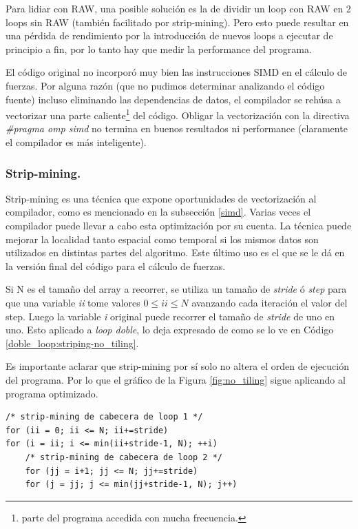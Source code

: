 \documentclass{article}
\begin{document}
Para lidiar con RAW, una posible solución es la de dividir un loop con RAW en 2 loops sin RAW (también
facilitado por strip-mining). Pero esto puede resultar en una pérdida de rendimiento por la introducción
de nuevos loops a ejecutar de principio a fin, por lo tanto hay que medir la performance del programa.


El código original no incorporó muy bien las instrucciones SIMD en el cálculo de fuerzas.
Por alguna razón (que no pudimos determinar analizando el código fuente)
incluso eliminando las dependencias de datos, el compilador se rehúsa a vectorizar
una parte caliente\footnote{parte del programa accedida con mucha frecuencia.} del código. Obligar la vectorización
con la directiva \textit{\#pragma omp simd} no termina en buenos resultados ni performance (claramente el compilador
es más inteligente).

\subsubsection{Strip-mining.\label{strip-mining}}
Strip-mining es una técnica que expone oportunidades de vectorización al compilador, como es mencionado
en la subsección \ref{simd}. Varias veces el compilador puede llevar a cabo esta optimización por su cuenta. La técnica
puede mejorar la localidad tanto espacial como temporal si los mismos datos son utilizados en distintas partes
del algoritmo. Este último uso es el que se le dá en la versión final del código para el cálculo de fuerzas.


Si N es el tamaño del array a recorrer, se utiliza un tamaño de \textit{stride} ó \textit{step} para que una variable \textit{ii}
tome valores $0\leq{ii}\leq N$ avanzando cada iteración el valor del step. Luego la variable \textit{i} original puede recorrer
el tamaño de \textit{stride} de uno en uno. Esto aplicado a \textit{loop doble}, lo deja expresado de como se lo ve en
Código \ref{doble_loop:striping-no_tiling}.

Es importante aclarar que strip-mining por sí solo no altera el orden de ejecución del programa. Por lo
que el gráfico de la Figura \ref{fig:no_tiling} sigue aplicando al programa optimizado.

\begin{lstlisting}[style=CStyle,label=doble_loop:striping-no_tiling,caption=doble loop con strip-mining en ambos loops.]
/* strip-mining de cabecera de loop 1 */
for (ii = 0; ii <= N; ii+=stride)
for (i = ii; i <= min(ii+stride-1, N); ++i)
	/* strip-mining de cabecera de loop 2 */
	for (jj = i+1; jj <= N; jj+=stride)
	for (j = jj; j <= min(jj+stride-1, N); j++)
\end{lstlisting}
\end{document}
